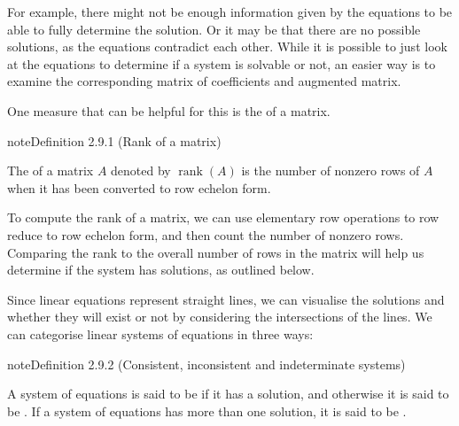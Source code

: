 \documentclass[letterpaper,10pt,english]{jupyterBook}
\begin{document}
\sphinxAtStartPar
For example, there might not be enough information given by the equations to be able to fully determine the solution. Or it may be that there are no possible solutions, as the equations contradict each other. While it is possible to just look at the equations to determine if a system is solvable or not, an easier way is to examine the corresponding matrix of coefficients and augmented matrix.

\sphinxAtStartPar
One measure that can be helpful for this is the  of a matrix.

\ignorespaces 
{}\ignorespaces \label{_pages/2.6_Consistent_systems:rank-definition}
\begin{sphinxadmonition}{note}{Definition 2.9.1 (Rank of a matrix)}



\sphinxAtStartPar
The  of a matrix \(A\) denoted by \(\operatorname{rank}(A)\) is the number of non\sphinxhyphen{}zero rows of \(A\) when it has been converted to row echelon form.
\end{sphinxadmonition}

\sphinxAtStartPar
To compute the rank of a matrix, we can use elementary row operations to row reduce to row echelon form, and then count the number of non\sphinxhyphen{}zero rows. Comparing the rank to the overall number of rows in the matrix will help us determine if the system has solutions, as outlined below.

\sphinxAtStartPar
Since linear equations represent straight lines, we can visualise the solutions \sphinxhyphen{} and whether they will exist or not \sphinxhyphen{} by considering the intersections of the lines. We can categorise linear systems of equations in three ways:
\label{_pages/2.6_Consistent_systems:consistent-inconsistent-and-indeterminate-systems-definition}
\begin{sphinxadmonition}{note}{Definition 2.9.2 (Consistent, inconsistent and indeterminate systems)}



\sphinxAtStartPar
A system of equations is said to be  if it has a solution, and otherwise it is said to be . If a system of equations has more than one solution, it is said to be .
\end{sphinxadmonition}

\ignorespaces 
\end{document}
